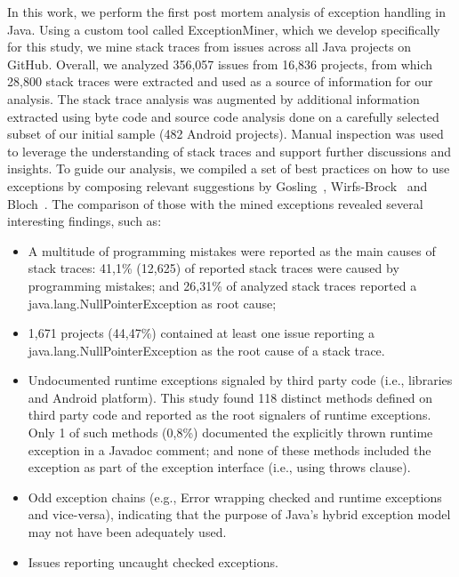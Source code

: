 \documentclass[conference]{IEEEtran}
\begin{document}
In this work, we perform the first post mortem analysis of exception handling in
Java. Using a custom tool called ExceptionMiner, which we develop specifically
for this study, we mine stack traces from issues across all Java projects on
GitHub. Overall, we analyzed 356,057 issues from 16,836 projects, from which
28,800 stack traces were extracted and used as a source of information for our
analysis. The stack trace analysis was augmented by additional information
extracted using byte code and source code analysis done on a carefully selected
subset of our initial sample (482 Android projects). Manual inspection was
used to leverage the understanding of stack traces and support
further discussions and insights.
To guide our analysis, we compiled a set of best practices on how to use
exceptions by composing relevant suggestions by Gosling~\cite{gosling2000java},
Wirfs-Brock~\cite{wirfs2006toward} and Bloch~\cite{bloch2008effective}.  The
comparison of those with the mined exceptions revealed several interesting
findings, such as:

\begin{itemize}

   \item  A multitude of programming mistakes were reported as the main causes of stack traces:
  41,1\%  (12,625)  of reported stack traces were caused by programming mistakes; and 26,31\% of analyzed stack traces reported a java.lang.NullPointerException as root cause;

   \item 1,671 projects (44,47\%) contained at least one issue reporting a java.lang.NullPointerException as the root cause of a stack trace.

  \item Undocumented runtime exceptions signaled by third party
    code (i.e., libraries and Android platform). This study found 118 distinct methods defined on third party code and  reported as the root signalers of runtime exceptions. Only 1 of such methods (0,8\%) documented the explicitly thrown runtime exception in a Javadoc comment; and none of these methods included the exception as part of the exception interface (i.e., using throws clause).

  \item  Odd exception chains (e.g., Error wrapping checked and runtime
    exceptions and vice-versa), indicating that the purpose of Java's hybrid
    exception model may not have been adequately used.

  \item  Issues reporting uncaught checked exceptions.


\end{itemize}
\end{document}
